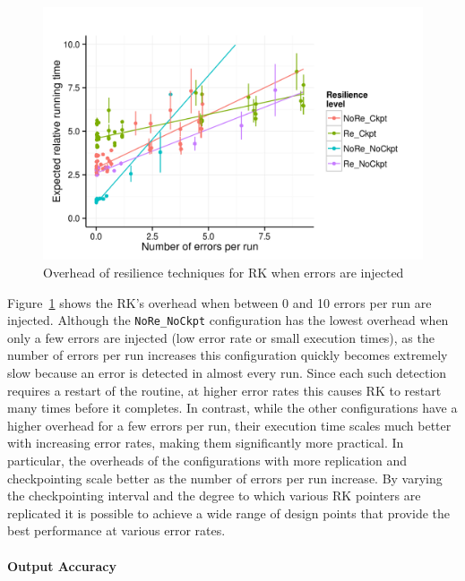 \documentclass{sig-alternate}
\begin{document}
\begin{figure}[ht!]
\centering
\includegraphics[width=1.00\columnwidth]{figs/4_1_2_Exp2_Expected_Running_Time_Needed.png}
\caption{Overhead of resilience techniques for RK when errors are injected}
\label{fig:rk_routine_exp_exec}
\end{figure}

Figure~\ref{fig:rk_routine_exp_exec} shows the RK's overhead when between 0 and 10 errors per run are injected.%
Although the \texttt{NoRe\_NoCkpt} configuration has the lowest overhead when only a few errors are injected (low error rate or small execution times), as the number of errors per run increases this configuration quickly becomes extremely slow because an error is detected in almost every run.
Since each such detection requires a restart of the routine, at higher error rates this causes RK to restart many times before it completes.
In contrast, while the other configurations have a higher overhead for a few errors per run, their execution time scales much better with increasing error rates, making them significantly more practical.
In particular, the overheads of the configurations with more replication and checkpointing scale better as the number of errors per run increase.
By varying the checkpointing interval and the degree to which various RK pointers are replicated it is possible to achieve a wide range of design points that provide the best performance at various error rates.

\paragraph{Output Accuracy}
\end{document}
